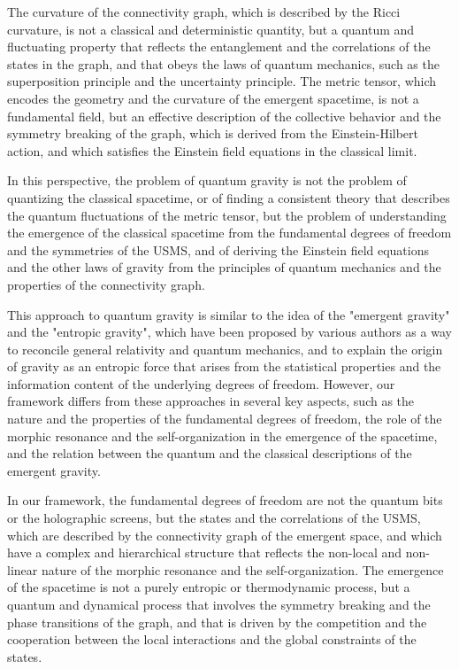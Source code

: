 \begin{tcolorbox}[colback=green!5!white,colframe=green!75!black,title=Question]
The curvature of the connectivity graph, which is described by the Ricci curvature, is not a classical and deterministic quantity, but a quantum and fluctuating property that reflects the entanglement and the correlations of the states in the graph, and that obeys the laws of quantum mechanics, such as the superposition principle and the uncertainty principle. The metric tensor, which encodes the geometry and the curvature of the emergent spacetime, is not a fundamental field, but an effective description of the collective behavior and the symmetry breaking of the graph, which is derived from the Einstein-Hilbert action, and which satisfies the Einstein field equations in the classical limit.

In this perspective, the problem of quantum gravity is not the problem of quantizing the classical spacetime, or of finding a consistent theory that describes the quantum fluctuations of the metric tensor, but the problem of understanding the emergence of the classical spacetime from the fundamental degrees of freedom and the symmetries of the USMS, and of deriving the Einstein field equations and the other laws of gravity from the principles of quantum mechanics and the properties of the connectivity graph.

This approach to quantum gravity is similar to the idea of the "emergent gravity" and the "entropic gravity", which have been proposed by various authors as a way to reconcile general relativity and quantum mechanics, and to explain the origin of gravity as an entropic force that arises from the statistical properties and the information content of the underlying degrees of freedom. However, our framework differs from these approaches in several key aspects, such as the nature and the properties of the fundamental degrees of freedom, the role of the morphic resonance and the self-organization in the emergence of the spacetime, and the relation between the quantum and the classical descriptions of the emergent gravity.

In our framework, the fundamental degrees of freedom are not the quantum bits or the holographic screens, but the states and the correlations of the USMS, which are described by the connectivity graph of the emergent space, and which have a complex and hierarchical structure that reflects the non-local and non-linear nature of the morphic resonance and the self-organization. The emergence of the spacetime is not a purely entropic or thermodynamic process, but a quantum and dynamical process that involves the symmetry breaking and the phase transitions of the graph, and that is driven by the competition and the cooperation between the local interactions and the global constraints of the states.


\end{tcolorbox}
